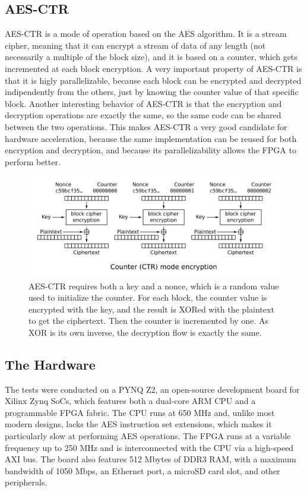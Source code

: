 \documentclass[12pt,oneside,a4paper]{article}
\begin{document}
\subsection{AES-CTR} \label{subsec:aes-ctr}
AES-CTR is a mode of operation based on the AES algorithm. It is a stream cipher, meaning that it can encrypt a stream of data of any length (not necessarily a multiple of the block size), and it is based on a counter, which gets incremented at each block encryption.
A very important property of AES-CTR is that it is higly parallelizable, because each block can be encrypted and decrypted indipendently from the others, just by knowing the counter value of that specific block.
Another interesting behavior of AES-CTR is that the encryption and decryption operations are exactly the same, so the same code can be shared between the two operations.
This makes AES-CTR a very good candidate for hardware acceleration, because the same implementation can be reused for both encryption and decryption, and because its parallelizability allows the FPGA to perform better.
\begin{figure}
	\centering
	\includegraphics[width=\textwidth]{CTR_encryption_scheme.png}
	\caption{AES-CTR requires both a key and a nonce, which is a random value used to initialize the counter. For each block, the counter value is encrypted with the key, and the result is XORed with the plaintext to get the ciphertext. Then the counter is incremented by one. As XOR is its own inverse, the decryption flow is exactly the same. \cite{pic:aes-ctr}}
\end{figure}

\subsection{The Hardware} \label{subsec:the-hardware}
The tests were conducted on a PYNQ Z2, an open-source development board for Xilinx Zynq SoCs, which features both a dual-core ARM CPU and a programmable FPGA fabric.
The CPU runs at 650 MHz and, unlike most modern designs, lacks the AES instruction set extensions, which makes it particularly slow at performing AES operations.
The FPGA runs at a variable frequency up to 250 MHz and is interconnected with the CPU via a high-speed AXI bus.
The board also features 512 Mbytes of DDR3 RAM, with a maximum bandwidth of 1050 Mbps, an Ethernet port, a microSD card slot, and other peripherals.
\end{document}
